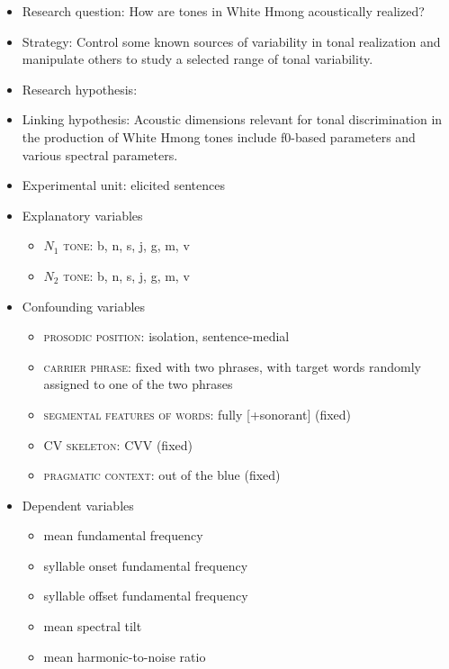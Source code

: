\documentclass[12pt]{article}
\begin{document}
\begin{itemize}
  \item Research question: How are tones in White Hmong acoustically realized?
  \item Strategy: Control some known sources of variability in tonal
  realization and manipulate others to study a selected range of tonal variability.
  \item Research hypothesis: 
  \item Linking hypothesis: Acoustic dimensions relevant for tonal
  discrimination in the production of White Hmong tones include
  f0-based parameters and various spectral parameters.
  \item Experimental unit: elicited sentences
  \item Explanatory variables
  \begin{itemize}
    \item \textsc{$N_1$ tone}: b, n, s, j, g, m, v
    \item \textsc{$N_2$ tone}: b, n, s, j, g, m, v
  \end{itemize}
  \item Confounding variables
  \begin{itemize}
    \item \textsc{prosodic position}: isolation, sentence-medial
    \item \textsc{carrier phrase}: fixed with two phrases, with target
    words randomly assigned to one of the two phrases
    \item \textsc{segmental features of words}: fully [+sonorant] (fixed) 
    \item \textsc{CV skeleton}: CVV (fixed)
    \item \textsc{pragmatic context}: out of the blue (fixed)
  \end{itemize}
  \item Dependent variables
  \begin{itemize}
    \item mean fundamental frequency
    \item syllable onset fundamental frequency
    \item syllable offset fundamental frequency
    \item mean spectral tilt
    \item mean harmonic-to-noise ratio
  \end{itemize}
\end{itemize}
\end{document}
